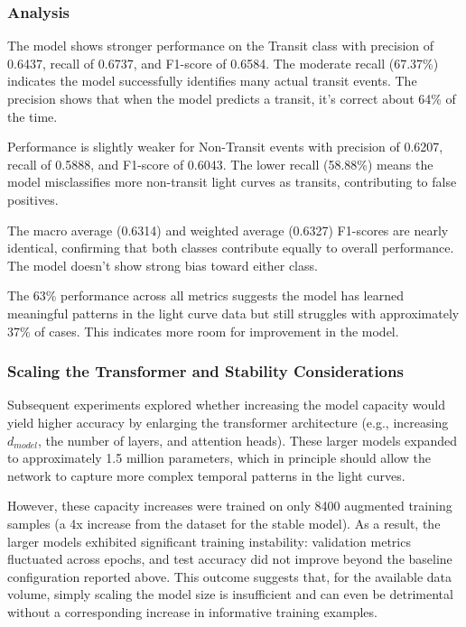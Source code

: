 \documentclass[letterpaper]{article} %
\begin{document}
\subsubsection*{Analysis}

The model shows stronger performance on the Transit class with precision of 0.6437, recall of 0.6737, and F1-score of 0.6584. The moderate recall (67.37\%) indicates the model successfully identifies many actual transit events. The precision shows that when the model predicts a transit, it's correct about 64\% of the time.

Performance is slightly weaker for Non-Transit events with precision of 0.6207, recall of 0.5888, and F1-score of 0.6043. The lower recall (58.88\%) means the model misclassifies more non-transit light curves as transits, contributing to false positives.

The macro average (0.6314) and weighted average (0.6327) F1-scores are nearly identical, confirming that both classes contribute equally to overall performance. The model doesn't show strong bias toward either class.

The 63\% performance across all metrics suggests the model has learned meaningful patterns in the light curve data but still struggles with approximately 37\% of cases. This indicates more room for improvement in the model. 

\subsubsection*{Scaling the Transformer and Stability Considerations}

Subsequent experiments explored whether increasing the model capacity would yield higher accuracy by enlarging the transformer architecture (e.g., increasing \(d_{model}\), the number of layers, and attention heads). These larger models expanded to approximately 1.5 million parameters, which in principle should allow the network to capture more complex temporal patterns in the light curves.

However, these capacity increases were trained on only 8400 augmented training samples (a 4x increase from the dataset for the stable model). As a result, the larger models exhibited significant training instability: validation metrics fluctuated across epochs, and test accuracy did not improve beyond the baseline configuration reported above. This outcome suggests that, for the available data volume, simply scaling the model size is insufficient and can even be detrimental without a corresponding increase in informative training examples.
\end{document}
